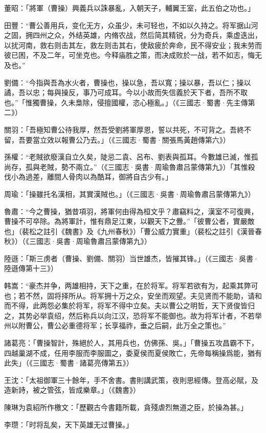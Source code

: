 董昭：「將軍（曹操）興義兵以誅暴亂，入朝天子，輔翼王室，此五伯之功也。」

田豐：“曹公善用兵，变化无方，众虽少，未可轻也，不如以久持之。将军据山河之固，拥四州之众，外结英雄，内脩农战，然后简其精锐，分为奇兵，乘虚迭出，以扰河南，救右则击其左，救左则击其右，使敌疲於奔命，民不得安业；我未劳而彼已困，不及二年，可坐克也。今释庙胜之策，而决成败於一战，若不如志，悔无及也。”

劉備：“今指與吾為水火者，曹操也，操以急，吾以寬；操以暴，吾以仁；操以譎，吾以忠；每與操反，事乃可成耳。今以小故而失信義於天下者，吾所不取也。”「惟獨曹操，久未梟除，侵擅國權，恣心極亂。」（《三國志·蜀書·先主傳第二》）

關羽：「吾極知曹公待我厚，然吾受劉將軍厚恩，誓以共死，不可背之。吾終不留，吾要當立效以報曹公乃去。」（《三國志·蜀書·關張馬黃趙傳第六》）

孫權：“老賊欲廢漢自立久矣，陡忌二袁、呂布、劉表與孤耳。今數雄已滅，惟孤尚存，孤與老賊，勢不兩立。”（《三國志·吳書·周瑜魯肅吕蒙傳第九》）「其惟殺伐小為過差，離間人骨肉以為酷耳，御將自古少有。」

周瑜：「操雖托名漢相，其實漢賊也。」（《三國志·吳書·周瑜魯肅吕蒙傳第九》）

魯肅：“今之曹操，猶昔項羽，將軍何由得為桓文乎？肅竊料之，漢室不可復興，曹操不可卒除。為將軍計，惟有鼎足江東，以觀天下之釁。”「彼曹公者，實嚴敵也」（裴松之註引《魏書》及《九州春秋》）「曹公威力實重」（裴松之註引《漢晉春秋》）（《三國志·吳書·周瑜魯肅吕蒙傳第九》）

陸遜：「斯三虏者（曹操、劉備、關羽）当世雄杰，皆摧其锋。」（《三國志·吳書·陸遜傳第十三》）

韩嵩：“豪杰并争，两雄相持，天下之重，在於将军。将军若欲有为，起乘其弊可也；若不然，固将择所从。将军拥十万之众，安坐而观望。夫见贤而不能助，请和而不得，此两怨必集於将军，将军不得中立矣。夫以曹公之明哲，天下贤俊皆归之，其势必举袁绍，然后称兵以向江汉，恐将军不能御也。故为将军计者，不若举州以附曹公，曹公必重德将军；长享福祚，垂之后嗣，此万全之策也。”

諸葛亮：「曹操智計，殊絕於人，其用兵也，仿佛孫、吳。」「曹操五攻昌霸不下，四越巢湖不成，任用李服而李服圖之，委夏侯而夏侯敗亡，先帝每稱操爲能，猶有此失」（《三國志·蜀書·諸葛亮傳第五》）

王沈：「太祖御軍三十餘年，手不舍書。書則講武策，夜則思經傳。登高必賦，及造新詩，被之管弦，皆成樂章。」（《魏書》）

陳琳为袁紹所作檄文：「歷觀古今書籍所載，貪殘虐烈無道之臣，於操為甚。」

李瓒：「时将乱矣，天下英雄无过曹操。」

